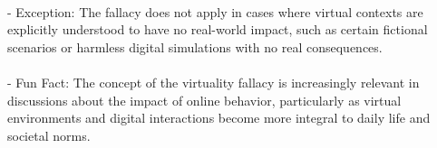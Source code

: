\documentclass[a4paper,12pt,single,pdftex]{scrartcl}
\begin{document}
    \\

    
      - Exception: The fallacy does not apply in cases where virtual contexts are explicitly understood to have no real-world impact, such as certain fictional scenarios or harmless digital simulations with no real consequences.
    \\

    
      
    \\

    
      - Fun Fact: The concept of the virtuality fallacy is increasingly relevant in discussions about the impact of online behavior, particularly as virtual environments and digital interactions become more integral to daily life and societal norms.
    \\
\end{document}
